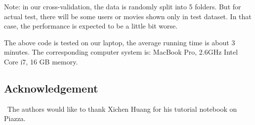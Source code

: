 \documentclass[12pt]{article}
\begin{document}
Note: in our cross-validation, the data is randomly split into 5 folders. But for actual test, there will be some users or movies shown only in test dataset. In that case, the performance is expected to be a little bit worse.

The above code is tested on our laptop, the average running time is about 3 minutes. The corresponding computer system is:
MacBook Pro, 2.6GHz Intel Core i7, 16 GB memory.  

\subsection*{Acknowledgement}


\quad\ The authors would like to thank Xichen Huang for his tutorial notebook on Piazza.

\vfill\pagebreak

%
\end{document}
